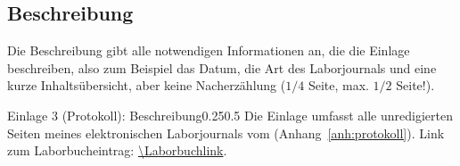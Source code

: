\subsection{Beschreibung}
\begin{hinweise}
Die Beschreibung gibt alle notwendigen Informationen an, die die Einlage beschreiben, also zum Beispiel das
Datum, die Art des Laborjournals und eine kurze Inhaltsübersicht, aber keine Nacherzählung ($1/4$ Seite, max.
$1/2$ Seite!).
\end{hinweise}
\begin{umfang}{Einlage 3 (Protokoll): Beschreibung}{0.25}{0.5}
Die Einlage umfasst alle unredigierten Seiten meines elektronischen Laborjournals vom \Protokolldatum{}
(Anhang~\ref{anh:protokoll}). Link zum Laborbucheintrag: \expandafter\url\expandafter{\Laborbuchlink}.

\end{umfang}

